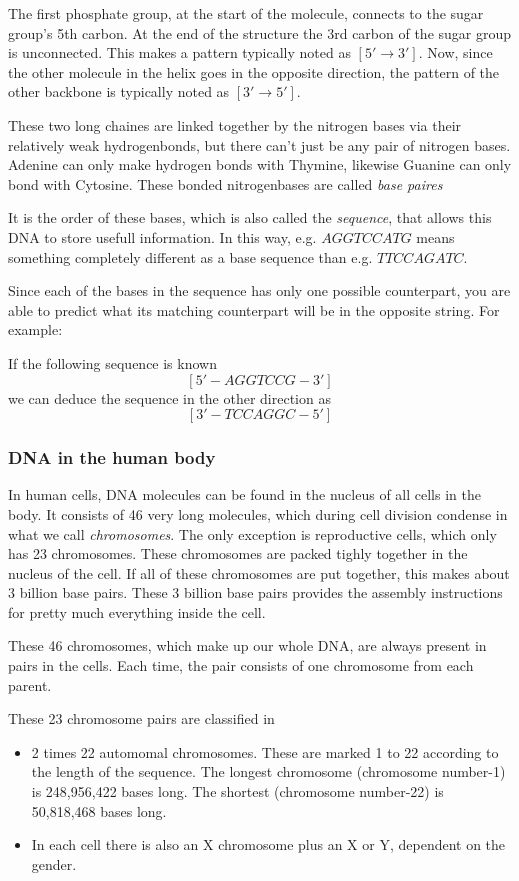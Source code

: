 The first phosphate group, at the start of the molecule, connects to the sugar group's 5th carbon. At the end of the structure the 3rd carbon of the sugar group is unconnected. This makes a pattern typically noted as $[5' \rightarrow 3']$. Now, since the other molecule in the helix goes in the opposite direction, the pattern of the other backbone is typically noted as $[3' \rightarrow 5']$.

These two long chaines are linked together by the nitrogen bases via their relatively weak hydrogenbonds, but there can't just be any pair of nitrogen bases. Adenine can only make hydrogen bonds with Thymine, likewise Guanine can only bond with Cytosine. These bonded nitrogenbases are called \emph{base paires}

It is the order of these bases, which is also called the \emph{sequence}, that allows this DNA to store usefull information. In this way, e.g. $AGGTCCATG$ means something completely different as a base sequence than e.g. $TTCCAGATC$.

Since each of the bases in the sequence has only one possible counterpart, you are able to predict what its matching counterpart will be in the opposite string. For example:

If the following sequence is known
$$[5' - AGGTCCG - 3']$$
we can deduce the sequence in the other direction as
$$[3' - TCCAGGC - 5']$$

\subsubsection{DNA in the human body}

In human cells, DNA molecules can be found in the nucleus of all cells in the body. It consists of 46 very long molecules, which during cell division condense in what we call \emph{chromosomes}. The only exception is reproductive cells, which only has 23 chromosomes. These chromosomes are packed tighly together in the nucleus of the cell. If all of these chromosomes are put together, this makes about 3 billion base pairs. These 3 billion base pairs provides the assembly instructions for pretty much everything inside the cell.

These 46 chromosomes, which make up our whole DNA, are always present in pairs in the cells. Each time, the pair consists of one chromosome from each parent. 

These 23 chromosome pairs are classified in 
\begin{itemize}
	\item 2 times 22 automomal chromosomes. These are marked 1 to 22 according to the length of the sequence. The longest chromosome (chromosome number-1) is 248,956,422 bases long. The shortest (chromosome number-22) is 50,818,468 bases long.
	\item In each cell there is also an X chromosome plus an X or Y, dependent on the gender.
\end{itemize}

